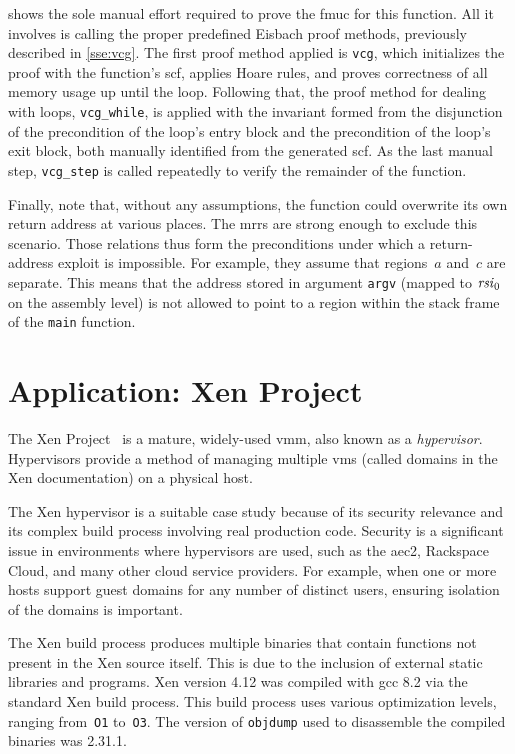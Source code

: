  shows the sole manual effort required
to prove the \ac{fmuc} for this function.
All it involves is calling the proper predefined Eisbach proof methods,
previously described in \cref{sse:vcg}.
The first proof method applied is \lstinline|vcg|,
which initializes the proof with the function's \ac{scf}, applies Hoare rules,
and proves correctness of all memory usage up until the loop.
Following that, the proof method for dealing with loops, \lstinline|vcg_while|,
is applied with the invariant formed from the disjunction
of the precondition of the loop's entry block
and the precondition of the loop's exit block,
both manually identified from the generated \ac{scf}.
As the last manual step, \lstinline|vcg_step| is called repeatedly
to verify the remainder of the function.

Finally, note that, without any assumptions,
the function could overwrite its own return address at various places.
The \acp{mrr} are strong enough to exclude this scenario.
Those relations thus form the preconditions
under which a return-address exploit is impossible.%
For example, they assume that regions~$a$ and~$c$ are separate.
This means that the address stored in argument \lstinline[style=C]|argv|
(mapped to $\mathit{rsi}_0$ on the assembly level)
is not allowed to point to a region
within the stack frame of the \lstinline[style=C]|main| function.

\section{Application: Xen Project}\label{se:xen}
The Xen Project~\citep{chisnall2008definitive}%
is a mature, widely-used \ac{vmm}, also known as a \emph{hypervisor}.%
Hypervisors provide a method of managing multiple
\acp{vm} (called domains in the Xen documentation) on a physical host.%

The Xen hypervisor is a suitable case study because of its security relevance%
and its complex build process involving real production code.
Security is a significant issue in environments where hypervisors are used,
such as the \ac{aec2}, Rackspace Cloud, and many other cloud service providers.
For example, when one or more hosts support guest domains
for any number of distinct users,
ensuring isolation of the domains is important.

The Xen build process produces multiple binaries
that contain functions not present in the Xen source itself.
This is due to the inclusion of external static libraries and programs.
Xen version 4.12 was compiled with \ac{gcc} 8.2 via the standard Xen build process.
This build process uses various optimization levels,
ranging from~\texttt{O1} to~\texttt{O3}.
The version of \texttt{objdump} used to disassemble the compiled binaries was 2.31.1.%
%

